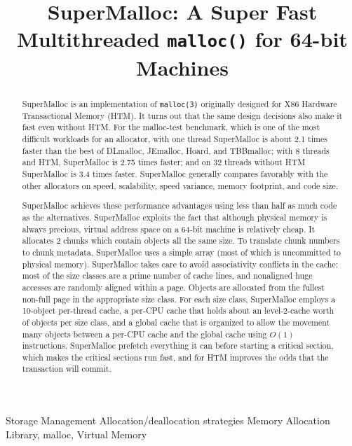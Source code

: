\documentclass{sigplanconf}
\begin{document}
\setlength{\pdfpageheight}{\paperheight}
\setlength{\pdfpagewidth}{\paperwidth}

\title{SuperMalloc: A Super Fast Multithreaded \texttt{malloc()} for 64-bit Machines}
\date{}
\maketitle
\begin{abstract}

SuperMalloc is an implementation of \texttt{malloc(3)} originally
designed for X86 Hardware Transactional Memory (HTM)\@.  It turns out
that the same design decisions also make it fast even without HTM\@.
For the malloc-test benchmark, which is one of the most difficult
workloads for an allocator, with one thread SuperMalloc is about 2.1
times faster than the best of DLmalloc, JEmalloc, Hoard, and
TBBmalloc; with 8 threads and HTM, SuperMalloc is 2.75 times faster;
and on 32 threads without HTM SuperMalloc is 3.4 times faster.
SuperMalloc generally compares favorably with the other allocators on
speed, scalability, speed variance, memory footprint, and code size.

SuperMalloc achieves these performance advantages using less than half
as much code as the alternatives.  SuperMalloc exploits the fact that
although physical memory is always precious, virtual address space on
a 64-bit machine is relatively cheap.  It allocates
\unit{2}\mebi\byte{} chunks which contain objects all the same size.
To translate chunk numbers to chunk metadata, SuperMalloc uses a
simple array (most of which is uncommitted to physical memory).
SuperMalloc takes care to avoid associativity conflicts in the cache:
most of the size classes are a prime number of cache lines, and
nonaligned huge accesses are randomly aligned within a page.  Objects
are allocated from the fullest non-full page in the appropriate size
class.  For each size class, SuperMalloc employs a 10-object
per-thread cache, a per-CPU cache that holds about an level-2-cache
worth of objects per size class, and a global cache that is organized
to allow the movement many objects between a per-CPU cache and the
global cache using $O(1)$ instructions.  SuperMalloc prefetch
everything it can before starting a critical section, which makes the
critical sections run fast, and for HTM improves the odds that the
transaction will commit.

\end{abstract}
                {Storage Management}
                {Allocation/deallocation strategies}
\keywords{}
Memory Allocation Library, malloc, Virtual Memory
\end{document}
